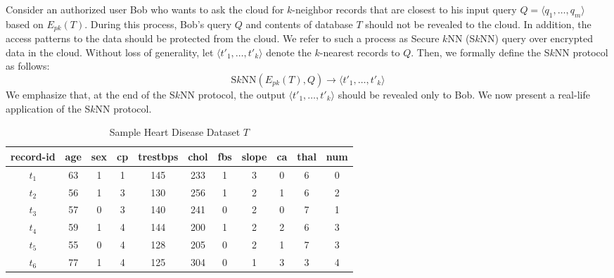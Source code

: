 \documentclass{article}
\begin{document}
Consider an authorized user Bob who wants 
to ask the cloud for $k$-neighbor records that are closest to his 
input query $Q = \langle q_1, \ldots, q_m\rangle$ based on $E_{pk}(T)$. 
During this process, Bob's query $Q$ and contents of database $T$ should not be 
revealed to the cloud. In addition, the access patterns to the data should be protected 
from the cloud. We refer 
to such a process as Secure $k$NN (S$k$NN) query over encrypted 
data in the cloud. Without loss of generality, let $\langle t'_1, \ldots, t'_k \rangle$ denote 
the $k$-nearest records to $Q$. Then, we formally define the S$k$NN protocol as follows: 
$$\textrm{S}k\textrm{NN}(E_{pk}(T), Q) \rightarrow \langle t'_1,\dots,t'_k \rangle$$ 
We emphasize that, at the end of the S$k$NN protocol, the output $\langle t'_1,\dots,t'_k \rangle$ should 
be revealed only to Bob. We now present a real-life application of the S$k$NN protocol. 


\renewcommand{\tabcolsep}{.15cm}
\begin{table}[!t]
\centering
\caption{Sample Heart Disease Dataset $T$} \begin{tabular}{ccccccccccc}  
     \hline\hline record-id &\;age&\;sex&\;cp&\;trestbps&\;chol&\;fbs&\;slope&\;ca&\;thal&\;num \\ [1ex] \hline $t_1$ &63 & 1 & 1 & 145 & 233 & 1 & 3 & 0 &6 & 0  \\ $t_2$ & 56 & 1  & 3	&130& 256 & 1& 2 & 1 & 6&2\\
    	$t_3$ & 57 & 0 & 3  & 140 & 241 & 0 & 2 & 0 & 7 & 1 \\
    	$t_4$ & 59 & 1 & 4 & 144 & 200 & 1 & 2 & 2 & 6 & 3 \\
    	$t_5$ & 55 & 0 & 4  & 128 & 205 & 0 & 2 & 1 &7 & 3 \\
    	$t_6$ & 77 & 1 & 4 & 125 & 304 & 0 & 1 & 3 & 3 & 4 \\ [1ex] \hline \end{tabular}\label{table:example} \end{table} 
\end{document}
